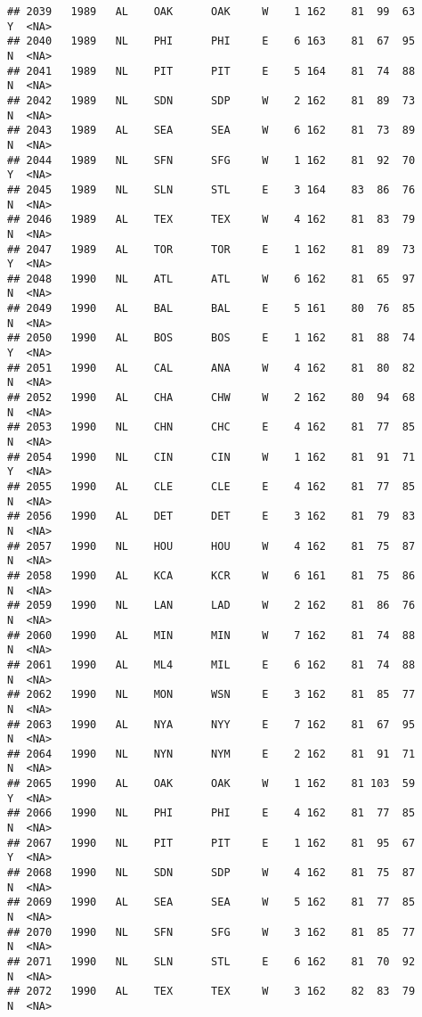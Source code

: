 \documentclass[]{article}
\begin{document}
\begin{verbatim}
## 2039   1989   AL    OAK      OAK     W    1 162    81  99  63      Y  <NA>
## 2040   1989   NL    PHI      PHI     E    6 163    81  67  95      N  <NA>
## 2041   1989   NL    PIT      PIT     E    5 164    81  74  88      N  <NA>
## 2042   1989   NL    SDN      SDP     W    2 162    81  89  73      N  <NA>
## 2043   1989   AL    SEA      SEA     W    6 162    81  73  89      N  <NA>
## 2044   1989   NL    SFN      SFG     W    1 162    81  92  70      Y  <NA>
## 2045   1989   NL    SLN      STL     E    3 164    83  86  76      N  <NA>
## 2046   1989   AL    TEX      TEX     W    4 162    81  83  79      N  <NA>
## 2047   1989   AL    TOR      TOR     E    1 162    81  89  73      Y  <NA>
## 2048   1990   NL    ATL      ATL     W    6 162    81  65  97      N  <NA>
## 2049   1990   AL    BAL      BAL     E    5 161    80  76  85      N  <NA>
## 2050   1990   AL    BOS      BOS     E    1 162    81  88  74      Y  <NA>
## 2051   1990   AL    CAL      ANA     W    4 162    81  80  82      N  <NA>
## 2052   1990   AL    CHA      CHW     W    2 162    80  94  68      N  <NA>
## 2053   1990   NL    CHN      CHC     E    4 162    81  77  85      N  <NA>
## 2054   1990   NL    CIN      CIN     W    1 162    81  91  71      Y  <NA>
## 2055   1990   AL    CLE      CLE     E    4 162    81  77  85      N  <NA>
## 2056   1990   AL    DET      DET     E    3 162    81  79  83      N  <NA>
## 2057   1990   NL    HOU      HOU     W    4 162    81  75  87      N  <NA>
## 2058   1990   AL    KCA      KCR     W    6 161    81  75  86      N  <NA>
## 2059   1990   NL    LAN      LAD     W    2 162    81  86  76      N  <NA>
## 2060   1990   AL    MIN      MIN     W    7 162    81  74  88      N  <NA>
## 2061   1990   AL    ML4      MIL     E    6 162    81  74  88      N  <NA>
## 2062   1990   NL    MON      WSN     E    3 162    81  85  77      N  <NA>
## 2063   1990   AL    NYA      NYY     E    7 162    81  67  95      N  <NA>
## 2064   1990   NL    NYN      NYM     E    2 162    81  91  71      N  <NA>
## 2065   1990   AL    OAK      OAK     W    1 162    81 103  59      Y  <NA>
## 2066   1990   NL    PHI      PHI     E    4 162    81  77  85      N  <NA>
## 2067   1990   NL    PIT      PIT     E    1 162    81  95  67      Y  <NA>
## 2068   1990   NL    SDN      SDP     W    4 162    81  75  87      N  <NA>
## 2069   1990   AL    SEA      SEA     W    5 162    81  77  85      N  <NA>
## 2070   1990   NL    SFN      SFG     W    3 162    81  85  77      N  <NA>
## 2071   1990   NL    SLN      STL     E    6 162    81  70  92      N  <NA>
## 2072   1990   AL    TEX      TEX     W    3 162    82  83  79      N  <NA>

\end{verbatim}
\end{document}
